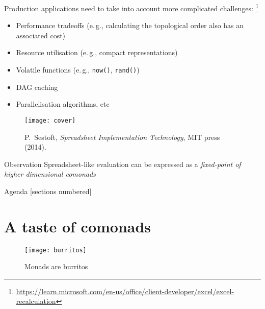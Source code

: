 \documentclass[10pt]{beamer}
\providecommand{\eg}{e.\,g.}
\begin{document}
\begin{frame}[fragile]
  Production applications need to take into account more complicated challenges:%
  \footnote{\url{https://learn.microsoft.com/en-us/office/client-developer/excel/excel-recalculation}}
  \begin{itemize}
    \item Performance tradeoffs (\eg, calculating the topological order also has an associated cost) 
    \item Resource utilisation  (\eg, compact representations) 
    \item Volatile functions (\eg, \verb|now()|, \verb|rand()|)
    \item DAG caching 
    \item Parallelisation algorithms, etc
  \end{itemize}
\end{frame}

\begin{frame}[fragile]
  \begin{figure}
    \centering
    \texttt{[image: cover]}
    \caption{P.~Sestoft, \emph{Spreadsheet Implementation Technology}, MIT press (2014).\protect\footnotemark} 
  \end{figure}
\end{frame}


\begin{frame}[fragile]
  \begin{alertblock}{Observation}
    Spreadsheet-like evaluation can be expressed as a \emph{fixed-point of higher dimensional comonads}
  \end{alertblock}
\end{frame}

\begin{frame}{Agenda}
  [sections numbered]
  \tableofcontents[hideallsubsections]
\end{frame}

\section{A taste of comonads}

\begin{frame}[fragile]
  \begin{figure}
    \centering
    \texttt{[image: burritos]}
    \caption{Monads are burritos}
  \end{figure}
\end{frame}
\end{document}
